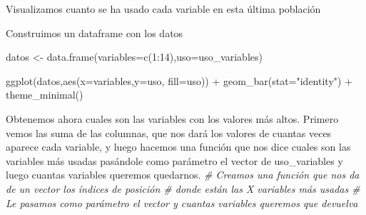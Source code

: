 \documentclass[
  a4paper,
  DIV=11,
  numbers=noendperiod]{scrreprt}
\newenvironment{Shaded}{\begin{snugshade}}{\end{snugshade}}
\newcommand{\AttributeTok}[1]{\textcolor[rgb]{0.77,0.63,0.00}{#1}}
\newcommand{\CommentTok}[1]{\textcolor[rgb]{0.56,0.35,0.01}{\textit{#1}}}
\newcommand{\DecValTok}[1]{\textcolor[rgb]{0.00,0.00,0.81}{#1}}
\newcommand{\FunctionTok}[1]{\textcolor[rgb]{0.00,0.00,0.00}{#1}}
\newcommand{\NormalTok}[1]{\textcolor[rgb]{0.00,0.00,0.00}{#1}}
\newcommand{\OtherTok}[1]{\textcolor[rgb]{0.56,0.35,0.01}{#1}}
\newcommand{\SpecialCharTok}[1]{\textcolor[rgb]{0.00,0.00,0.00}{#1}}
\newcommand{\StringTok}[1]{\textcolor[rgb]{0.31,0.60,0.02}{#1}}
\begin{document}
\begin{Shaded}
\begin{Highlighting}[numbers=left,,]
\NormalTok{Visualizamos cuanto se ha usado cada variable en esta última población}
\end{Highlighting}
\end{Shaded}

\begin{Shaded}
\begin{Highlighting}[numbers=left,,]
\NormalTok{Construimos un dataframe con los datos}
\end{Highlighting}
\end{Shaded}

\begin{Shaded}
\begin{Highlighting}[numbers=left,,]
\NormalTok{datos }\OtherTok{\textless{}{-}} \FunctionTok{data.frame}\NormalTok{(}\AttributeTok{variables=}\FunctionTok{c}\NormalTok{(}\DecValTok{1}\SpecialCharTok{:}\DecValTok{14}\NormalTok{),}\AttributeTok{uso=}\NormalTok{uso\_variables)}
\end{Highlighting}
\end{Shaded}

\begin{Shaded}
\begin{Highlighting}[numbers=left,,]
\FunctionTok{ggplot}\NormalTok{(datos,}\FunctionTok{aes}\NormalTok{(}\AttributeTok{x=}\NormalTok{variables,}\AttributeTok{y=}\NormalTok{uso, }\AttributeTok{fill=}\NormalTok{uso)) }\SpecialCharTok{+} \FunctionTok{geom\_bar}\NormalTok{(}\AttributeTok{stat=}\StringTok{"identity"}\NormalTok{) }\SpecialCharTok{+} \FunctionTok{theme\_minimal}\NormalTok{()}
\end{Highlighting}
\end{Shaded}

\begin{Shaded}
\begin{Highlighting}[numbers=left,,]
\NormalTok{Obtenemos ahora cuales son las variables con los valores más altos. Primero vemos las suma de las columnas, que nos dará los valores de cuantas veces aparece cada variable, y luego hacemos una función que nos dice cuales son las variables más usadas pasándole como parámetro el vector de uso\_variables y luego cuantas variables queremos quedarnos. }\CommentTok{\# Creamos una función que nos da de un vector los índices de posición \# donde están las X variables más usadas \# Le pasamos como parámetro el vector y cuantas variables queremos que devuelva}
\end{Highlighting}
\end{Shaded}
\end{document}
